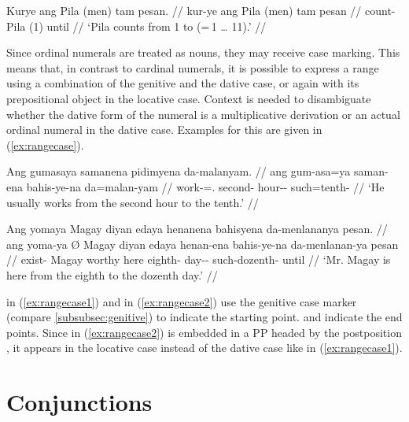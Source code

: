 \ex
\begingl
	\gla Kurye ang Pila {\normalfont (}men{\normalfont )} tam pesan. //
	\glb kur-ye ang Pila (men) tam pesan //
	\glc count-\TsgF{} \Aarg{} Pila (1) \elv{} until //
	\glft `Pila counts from 1 to \elv{} (=\,1 … 11).' //
\endgl
\xe

Since ordinal numerals are treated as nouns, they may receive case marking.
This means that, in contrast to cardinal numerals, it is possible to express a
range using a combination of the genitive and the dative case, or again
 with its prepositional object in the locative case.
Context is needed to disambiguate whether the dative form of the numeral is a
multiplicative derivation or an actual ordinal numeral in the dative case.
Examples for this are given in (\ref{ex:rangecase}).

\pex\label{ex:rangecase}
\a\label{ex:rangecase1}\begingl
	\gla Ang gumasaya samanena pidimyena da-malanyam. //
	\glb ang gum-asa=ya saman-ena bahis-ye-na da=malan-yam //
	\glc \AgtT{} work-\Hab{}=\TsgM{}.\Top{} second-\Gen{} hour-\Pl{}-\Gen{} 
		such=tenth-\Dat{} //
	\glft `He usually works from the second hour to the tenth.' //
\endgl

\a\label{ex:rangecase2}\begingl
	\gla Ang yomaya {} Magay diyan edaya henanena bahisyena da-menlananya 
		pesan. //
	\glb ang yoma-ya Ø Magay diyan edaya henan-ena bahis-ye-na 
		da-menlanan-ya pesan //
	\glc \AgtT{} exist-\TsgM{} \Top{} Magay worthy here eighth-\Gen{} 
		day-\Pl{}-\Gen{} such-dozenth-\Loc{} until //
	\glft `Mr. Magay is here from the eighth to the dozenth day.' //
\endgl

\xe

 in (\ref{ex:rangecase1}) and
 in (\ref{ex:rangecase2}) use the
genitive case marker  (compare \autoref{subsubsec:genitive}) to
indicate the starting point.  and
 indicate 
the end points. Since  in (\ref{ex:rangecase2}) is 
embedded in a PP headed by the postposition , it appears in 
the locative case instead of the dative case like  in 
(\ref{ex:rangecase1}).



\section{Conjunctions}
\label{sec:conjunctions}


